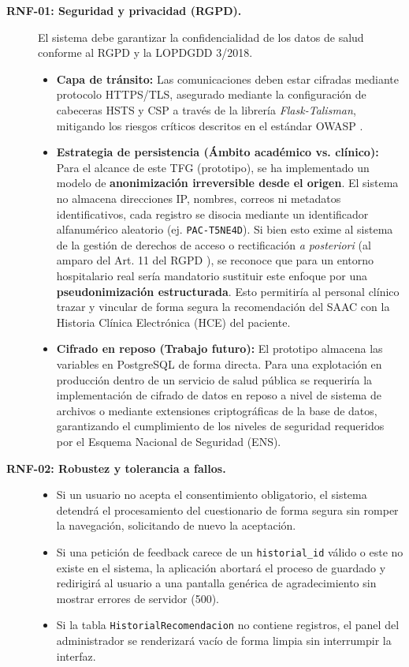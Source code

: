 \begin{description}
    	\item[\textbf{RNF-01: Seguridad y privacidad (RGPD).}] El sistema debe garantizar la confidencialidad de los datos de salud conforme al RGPD y la LOPDGDD 3/2018. \cite{ue:rgpd, boe:lopdgdd}
    \begin{itemize}
        \item \textbf{Capa de tránsito:} Las comunicaciones deben estar cifradas mediante protocolo HTTPS/TLS, asegurado mediante la configuración de cabeceras HSTS y CSP a través de la librería \textit{Flask-Talisman}, mitigando los riesgos críticos descritos en el estándar OWASP \cite{owasp:top10}.
        \item \textbf{Estrategia de persistencia (Ámbito académico vs. clínico):} Para el alcance de este TFG (prototipo), se ha implementado un modelo de \textbf{anonimización irreversible desde el origen}. El sistema no almacena direcciones IP, nombres, correos ni metadatos 				identificativos, cada registro se disocia mediante un identificador alfanumérico aleatorio (ej. \texttt{PAC-T5NE4D}). Si bien esto exime al sistema de la gestión de derechos de acceso o rectificación \textit{a posteriori} (al amparo del Art. 11 del RGPD \cite{ue:rgpd}), se reconoce que para un 			entorno hospitalario real sería mandatorio sustituir este enfoque por una \textbf{pseudonimización estructurada}. Esto permitiría al personal clínico trazar y vincular de forma segura la recomendación del SAAC con la Historia Clínica Electrónica (HCE) del paciente.
        \item \textbf{Cifrado en reposo (Trabajo futuro):} El prototipo almacena las variables en PostgreSQL de forma directa. Para una explotación en producción dentro de un servicio de salud pública se requeriría la implementación de cifrado de datos en reposo a nivel de 					sistema de archivos o mediante extensiones criptográficas de la base de datos, garantizando el cumplimiento de los niveles de seguridad requeridos por el Esquema Nacional de Seguridad (ENS). \cite{boe:ens}
    \end{itemize}
    	\item[\textbf{RNF-02: Robustez y tolerancia a fallos.}] \leavevmode
	\begin{itemize}
	\item Si un usuario no acepta el consentimiento obligatorio, el sistema detendrá el procesamiento del cuestionario de forma segura sin romper la navegación, solicitando de nuevo la aceptación.
        	\item Si una petición de feedback carece de un \texttt{historial\_id} válido o este no existe en el sistema, la aplicación abortará el proceso de guardado y redirigirá al usuario a una pantalla genérica de agradecimiento sin mostrar errores de servidor (500).
        	\item Si la tabla \texttt{HistorialRecomendacion} no contiene registros, el panel del administrador se renderizará vacío de forma limpia sin interrumpir la interfaz.
    	\end{itemize}
\end{description}

